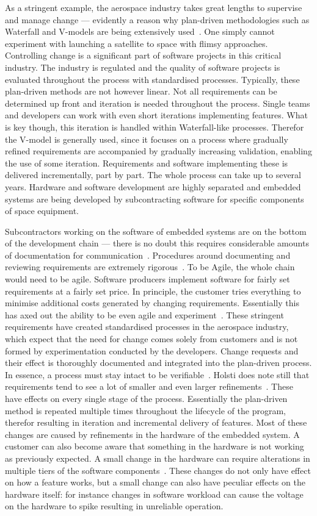\documentclass[english]{tktltiki2}
\begin{document}
As a stringent example, the aerospace industry takes great lengths to supervise and manage change — evidently a reason why plan-driven methodologies such as Waterfall and V-models are being extensively used~\cite{Hol15b}. One simply cannot experiment with launching a satellite to space with flimsy approaches. Controlling change is a significant part of software projects in this critical industry. The industry is regulated and the quality of software projects is evaluated throughout the process with standardised processes. Typically, these plan-driven methods are not however linear. Not all requirements can be determined up front and iteration is needed throughout the process. Single teams and developers can work with even short iterations implementing features. What is key though, this iteration is handled within Waterfall-like processes. Therefor the V-model is generally used, since it focuses on a process where gradually refined requirements are accompanied by gradually increasing validation, enabling the use of some iteration. Requirements and software implementing these is delivered incrementally, part by part. The whole process can take up to several years. Hardware and software development are highly separated and embedded systems are being developed by subcontracting software for specific components of space equipment.

Subcontractors working on the software of embedded systems are on the bottom of the development chain — there is no doubt this requires considerable amounts of documentation for communication~\cite{BT15, Hol15b}. Procedures around documenting and reviewing requirements are extremely rigorous~\cite{Hol15b}. To be Agile, the whole chain would need to be agile. Software producers implement software for fairly set requirements at a fairly set price. In principle, the customer tries everything to minimise additional costs generated by changing requirements. Essentially this has axed out the ability to be even agile and experiment~\cite{Hol15b}. These stringent requirements have created standardised processes in the aerospace industry, which expect that the need for change comes solely from customers and is not formed by experimentation conducted by the developers. Change requests and their effect is thoroughly documented and integrated into the plan-driven process. In essence, a process must stay intact to be verifiable~\cite{Hol15b}. Holsti does note still that requirements tend to see a lot of smaller and even larger refinements~\cite{Hol15b}. These have effects on every single stage of the process. Essentially the plan-driven method is repeated multiple times throughout the lifecycle of the program, therefor resulting in iteration and incremental delivery of features. Most of these changes are caused by refinements in the hardware of the embedded system. A customer can also become aware that something in the hardware is not working as previously expected. A small change in the hardware can require alterations in multiple tiers of the software components~\cite{Hol15b}. These changes do not only have effect on how a feature works, but a small change can also have peculiar effects on the hardware itself: for instance changes in software workload can cause the voltage on the hardware to spike resulting in unreliable operation.
\end{document}
